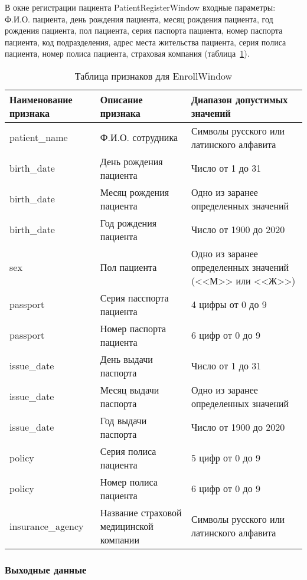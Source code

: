 В окне регистрации пациента PatientRegisterWindow входные параметры: Ф.И.О. пациента, день рождения пациента, месяц рождения пациента, год рождения пациента, пол пациента, серия паспорта пациента, номер паспорта пациента, код подразделения, адрес места жительства пациента, серия полиса пациента, номер полиса пациента, страховая компания (таблица~\ref{tab:tab_3}). 

\begin{table}[ht]
\caption{Таблица признаков для EnrollWindow}
\label{tab:tab_3}
\begin{center}
\begin{tabularx}{\linewidth}{|X|X|X|}
\hline
 Наименование признака & Описание признака & Диапазон допустимых значений\\
\hline
 patient\_name & Ф.И.О. сотрудника & Символы русского или латинского алфавита\\
\hline
 birth\_date & День рождения пациента & Число от 1 до 31\\
\hline
 birth\_date & Месяц рождения пациента & Одно из заранее определенных значений\\
\hline
 birth\_date & Год рождения пациента & Число от 1900 до 2020\\
\hline
 sex & Пол пациента & Одно из заранее определенных значений (<<М>> или <<Ж>>)\\
\hline
 passport & Серия пасспорта пациента & 4 цифры от 0 до 9 \\
\hline
 passport & Номер паспорта пациента & 6 цифр от 0 до 9 \\
\hline
 issue\_date & День выдачи паспорта & Число от 1 до 31\\
\hline
 issue\_date & Месяц выдачи паспорта & Одно из заранее определенных значений\\
\hline
 issue\_date & Год выдачи паспорта & Число от 1900 до 2020\\
\hline
 policy & Серия полиса пациента & 5 цифр от 0 до 9 \\
\hline
 policy & Номер полиса пациента & 6 цифр от 0 до 9 \\
\hline
 insurance\_agency & Название страховой медицинской компании & Символы русского или латинского алфавита \\
\hline
\end{tabularx}
\end{center}
\end{table}

\clearpagepage

\subsubsection{Выходные данные}


